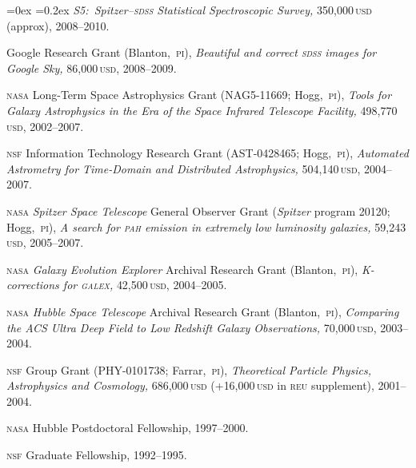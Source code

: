 \documentclass[12pt,letterpaper]{article}
\newcommand{\satellite}[1]{\textsl{#1}}
\newcommand{\usd}[1]{{#1}\,\textsc{usd}}
\newcommand{\grantnumber}[2]{{\footnotesize{#1}}; #2,~\textsc{pi}}
\newcounter{refpubnum}
\newcommand{\hogglist}{%
    \rightmargin=0in
    \leftmargin=0.18in
    \topsep=0ex
    \partopsep=0pt
    \itemsep=0.2ex
    \parsep=0pt
    \itemindent=-1.0\leftmargin
    \listparindent=0.0\leftmargin
    \settowidth{\labelsep}{~}
    \usecounter{refpubnum}
  }
\begin{document}
\begin{list}{}{\hogglist}
\textit{S5:\ Spitzer--\textsc{sdss} Statistical Spectroscopic Survey,}
\usd{350,000} (approx), 2008--2010.
\item
Google Research Grant
(Blanton,~\textsc{pi}), 
\textit{Beautiful and correct \textsc{sdss} images for Google Sky,}
\usd{86,000}, 2008--2009.
\item
\textsc{nasa} Long-Term Space Astrophysics Grant
(\grantnumber{NAG5-11669}{Hogg}),
\textit{Tools for Galaxy Astrophysics in the Era of the
\satellite{Space Infrared Telescope Facility,}}
\usd{498,770}, 2002--2007.
\item
\textsc{nsf} Information Technology Research Grant
(\grantnumber{AST-0428465}{Hogg}),
\textit{Automated Astrometry for Time-Domain and Distributed
Astrophysics,}
\usd{504,140}, 2004--2007.
\item
\textsc{nasa} \satellite{Spitzer Space Telescope} General Observer Grant
(\satellite{Spitzer} program {\footnotesize{20120}}; Hogg,~\textsc{pi}),
\textit{A search for \textsc{pah} emission in extremely low luminosity galaxies,}
\usd{59,243}, 2005--2007.
\item
\textsc{nasa} \satellite{Galaxy Evolution Explorer} Archival Research Grant
(Blanton,~\textsc{pi}),
\textit{K-corrections for \textsc{galex},}
\usd{42,500}, 2004--2005.
\item
\textsc{nasa} \satellite{Hubble Space Telescope} Archival Research Grant
(Blanton,~\textsc{pi}),
\textit{Comparing the ACS Ultra Deep Field to Low Redshift Galaxy Observations,}
\usd{70,000}, 2003--2004.
\item
\textsc{nsf} Group Grant
(\grantnumber{PHY-0101738}{Farrar}),
\textit{Theoretical Particle Physics, Astrophysics and Cosmology,}
\usd{686,000} (+\usd{16,000} in \textsc{reu} supplement), 2001--2004.
\item
\textsc{nasa} Hubble Postdoctoral Fellowship, 1997--2000.
\item
\textsc{nsf} Graduate Fellowship, 1992--1995.
\end{list}
\end{document}
